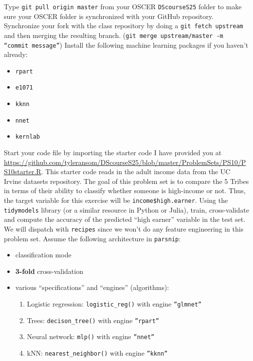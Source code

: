 \documentclass[12pt,english]{exam}
\begin{document}
\begin{questions}
\question Type \texttt{git pull origin master} from your OSCER \texttt{DScourseS25} folder to make sure your OSCER folder is synchronized with your GitHub repository. 
\question Synchronize your fork with the class repository by doing a \texttt{git fetch upstream} and then merging the resulting branch. (\texttt{git merge upstream/master -m ``commit message''})
\question Install the following machine learning packages if you haven't already:
\begin{itemize}
    \item \texttt{rpart}
    \item \texttt{e1071}
    \item \texttt{kknn}
    \item \texttt{nnet}
    \item \texttt{kernlab}
\end{itemize}
\question Start your code file by importing the starter code I have provided you at \url{https://github.com/tyleransom/DScourseS25/blob/master/ProblemSets/PS10/PS10starter.R}. This starter code reads in the adult income data from the UC Irvine datasets repository. The goal of this problem set is to compare the 5 Tribes in terms of their ability to classify whether someone is high-income or not. Thus, the target variable for this exercise will be \texttt{income\$high.earner}. 
\question Using the \texttt{tidymodels} library (or a similar resource in Python or Julia), train, cross-validate and compute the accuracy of the predicted ``high earner'' variable in the test set. We will dispatch with \texttt{recipes} since we won't do any feature engineering in this problem set.
Assume the following architecture in \texttt{parsnip}:
\begin{itemize}
\item classification mode
\item \textbf{3-fold} cross-validation
\item various ``specifications'' and ``engines'' (algorithms):
    \begin{enumerate}
    \item Logistic regression: \texttt{logistic\_reg()} with engine \texttt{''glmnet''}    
    \item Trees: \texttt{decison\_tree()} with engine \texttt{''rpart''}
    \item Neural network: \texttt{mlp()} with engine \texttt{''nnet''}      
    \item kNN: \texttt{nearest\_neighbor()} with engine \texttt{''kknn''}       

\end{enumerate}
\end{itemize}
\end{questions}
\end{document}
